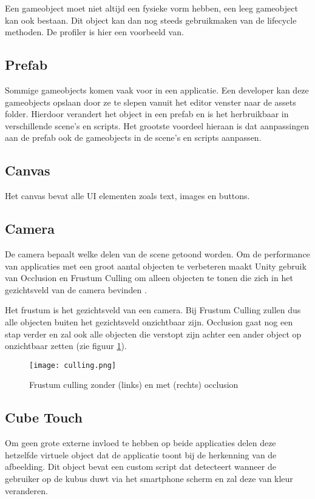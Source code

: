 Een gameobject moet niet altijd een fysieke vorm hebben, een leeg gameobject kan ook bestaan. Dit object kan dan nog steeds gebruikmaken van de lifecycle methoden. De profiler is hier een voorbeeld van.

\subsection{Prefab}
Sommige gameobjects komen vaak voor in een applicatie. Een developer kan deze gameobjects opslaan door ze te slepen vanuit het editor venster naar de assets folder. Hierdoor verandert het object in een prefab en is het herbruikbaar in verschillende scene's en scripts. Het grootste voordeel hieraan is dat aanpassingen aan de prefab ook de gameobjects in de scene's en scripts aanpassen.

\subsection{Canvas}
Het canvas bevat alle UI elementen zoals text, images en buttons.

\subsection{Camera}
De camera bepaalt welke delen van de scene getoond worden. Om de performance van applicaties met een groot aantal objecten te verbeteren maakt Unity gebruik van Occlusion en Frustum Culling om alleen objecten te tonen die zich in het gezichtsveld van de camera bevinden \autocite{UnityCulling}.

Het frustum is het gezichtsveld van een camera. Bij Frustum Culling zullen dus alle objecten buiten het gezichtsveld onzichtbaar zijn. Occlusion gaat nog een stap verder en zal ook alle objecten die verstopt zijn achter een ander object op onzichtbaar zetten (zie figuur \ref{fig:culling}).

\begin{figure}
    \texttt{[image: culling.png]}
    \caption{Frustum culling zonder (links) en met (rechts) occlusion \autocite{UnityCulling}}
    \label{fig:culling}
\end{figure}

\subsection{Cube Touch}
Om geen grote externe invloed te hebben op beide applicaties delen deze hetzelfde virtuele object dat de applicatie toont bij de herkenning van de afbeelding. Dit object bevat een custom script dat detecteert wanneer de gebruiker op de kubus duwt via het smartphone scherm en zal deze van kleur veranderen.

